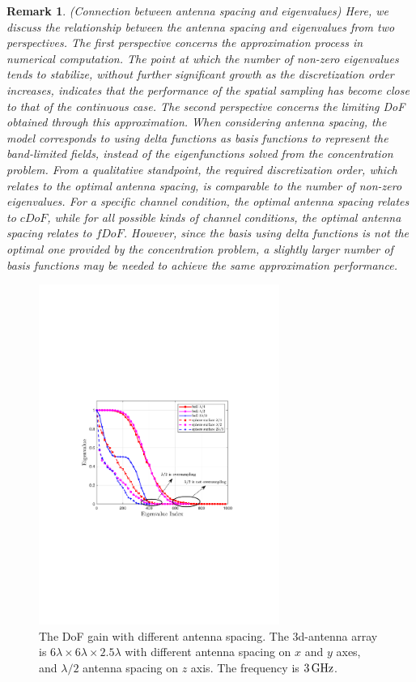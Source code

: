 \documentclass[12pt,draftclsnofoot,journal,onecolumn]{IEEEtran}
\newtheorem{remark}{Remark}
\begin{document}
		 {\color{red}
\begin{remark}
	(Connection between antenna spacing and eigenvalues) Here, we discuss the relationship between the antenna spacing and eigenvalues from two perspectives. The first perspective concerns the approximation process in numerical computation. The point at which the number of non-zero eigenvalues tends to stabilize, without further significant growth as the discretization order increases, indicates that the performance of the spatial sampling has become close to that of the continuous case. The second perspective concerns the limiting DoF obtained through this approximation. When considering antenna spacing, the model corresponds to using delta functions as basis functions to represent the band-limited fields, instead of the eigenfunctions solved from the concentration problem. From a qualitative standpoint, the required discretization order, which relates to the optimal antenna spacing, is comparable to the number of non-zero eigenvalues. For a specific channel condition, the optimal antenna spacing relates to $cDoF$, while for all possible kinds of channel conditions, the optimal antenna spacing relates to $fDoF$. 
	However, since the basis using delta functions is not the optimal one provided by the concentration problem, a slightly larger number of basis functions may be needed to achieve the same approximation performance. 
\end{remark}
		 }
	

\begin{figure}
	\centering 
	\includegraphics[width=0.7\textwidth]{figs/different_antenna_spacing_merge.pdf} 
	\caption{The DoF gain with different antenna spacing. The 3d-antenna array is $6\lambda \times 6\lambda \times 2.5\lambda$ with different antenna spacing on $x$ and $y$ axes, and $\lambda/2$ antenna spacing on $z$ axis. The frequency is $3\,{\rm GHz}$.} 
	\label{different_antenna_spacing_merge}
\end{figure}
\end{document}
